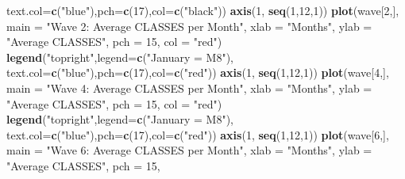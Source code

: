 \documentclass[
]{book}
\newenvironment{Shaded}{\begin{snugshade}}{\end{snugshade}}
\newcommand{\DataTypeTok}[1]{\textcolor[rgb]{0.13,0.29,0.53}{#1}}
\newcommand{\DecValTok}[1]{\textcolor[rgb]{0.00,0.00,0.81}{#1}}
\newcommand{\KeywordTok}[1]{\textcolor[rgb]{0.13,0.29,0.53}{\textbf{#1}}}
\newcommand{\NormalTok}[1]{#1}
\newcommand{\StringTok}[1]{\textcolor[rgb]{0.31,0.60,0.02}{#1}}
\begin{document}
\begin{Shaded}
\begin{Highlighting}[]
       \DataTypeTok{text.col=}\KeywordTok{c}\NormalTok{(}\StringTok{"blue"}\NormalTok{),}\DataTypeTok{pch=}\KeywordTok{c}\NormalTok{(}\DecValTok{17}\NormalTok{),}\DataTypeTok{col=}\KeywordTok{c}\NormalTok{(}\StringTok{"black"}\NormalTok{))}
\KeywordTok{axis}\NormalTok{(}\DecValTok{1}\NormalTok{, }\KeywordTok{seq}\NormalTok{(}\DecValTok{1}\NormalTok{,}\DecValTok{12}\NormalTok{,}\DecValTok{1}\NormalTok{))}
\KeywordTok{plot}\NormalTok{(wave[}\DecValTok{2}\NormalTok{,],}
     \DataTypeTok{main =} \StringTok{"Wave 2: Average CLASSES per Month"}\NormalTok{,}
     \DataTypeTok{xlab =} \StringTok{"Months"}\NormalTok{,}
     \DataTypeTok{ylab =} \StringTok{"Average CLASSES"}\NormalTok{,}
     \DataTypeTok{pch =} \DecValTok{15}\NormalTok{,}
     \DataTypeTok{col =} \StringTok{"red"}\NormalTok{)}
\KeywordTok{legend}\NormalTok{(}\StringTok{"topright"}\NormalTok{,}\DataTypeTok{legend=}\KeywordTok{c}\NormalTok{(}\StringTok{"January = M8"}\NormalTok{),}
       \DataTypeTok{text.col=}\KeywordTok{c}\NormalTok{(}\StringTok{"blue"}\NormalTok{),}\DataTypeTok{pch=}\KeywordTok{c}\NormalTok{(}\DecValTok{17}\NormalTok{),}\DataTypeTok{col=}\KeywordTok{c}\NormalTok{(}\StringTok{"red"}\NormalTok{))}
\KeywordTok{axis}\NormalTok{(}\DecValTok{1}\NormalTok{, }\KeywordTok{seq}\NormalTok{(}\DecValTok{1}\NormalTok{,}\DecValTok{12}\NormalTok{,}\DecValTok{1}\NormalTok{))}
\KeywordTok{plot}\NormalTok{(wave[}\DecValTok{4}\NormalTok{,],}
     \DataTypeTok{main =} \StringTok{"Wave 4: Average CLASSES per Month"}\NormalTok{,}
     \DataTypeTok{xlab =} \StringTok{"Months"}\NormalTok{,}
     \DataTypeTok{ylab =} \StringTok{"Average CLASSES"}\NormalTok{,}
     \DataTypeTok{pch =} \DecValTok{15}\NormalTok{,}
     \DataTypeTok{col =} \StringTok{"red"}\NormalTok{)}
\KeywordTok{legend}\NormalTok{(}\StringTok{"topright"}\NormalTok{,}\DataTypeTok{legend=}\KeywordTok{c}\NormalTok{(}\StringTok{"January = M8"}\NormalTok{),}
       \DataTypeTok{text.col=}\KeywordTok{c}\NormalTok{(}\StringTok{"blue"}\NormalTok{),}\DataTypeTok{pch=}\KeywordTok{c}\NormalTok{(}\DecValTok{17}\NormalTok{),}\DataTypeTok{col=}\KeywordTok{c}\NormalTok{(}\StringTok{"red"}\NormalTok{))}
\KeywordTok{axis}\NormalTok{(}\DecValTok{1}\NormalTok{, }\KeywordTok{seq}\NormalTok{(}\DecValTok{1}\NormalTok{,}\DecValTok{12}\NormalTok{,}\DecValTok{1}\NormalTok{))}
\KeywordTok{plot}\NormalTok{(wave[}\DecValTok{6}\NormalTok{,],}
     \DataTypeTok{main =} \StringTok{"Wave 6: Average CLASSES per Month"}\NormalTok{,}
     \DataTypeTok{xlab =} \StringTok{"Months"}\NormalTok{,}
     \DataTypeTok{ylab =} \StringTok{"Average CLASSES"}\NormalTok{,}
     \DataTypeTok{pch =} \DecValTok{15}\NormalTok{,}

\end{Highlighting}
\end{Shaded}
\end{document}
